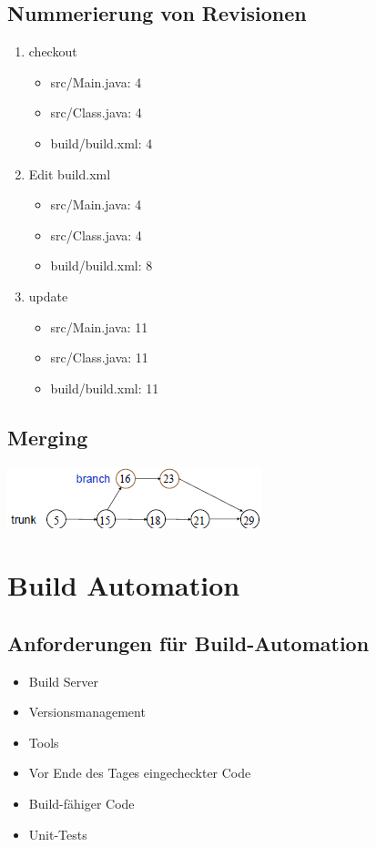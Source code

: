 \documentclass[a4paper,10pt]{article}
\begin{document}
\subsection{Nummerierung von Revisionen}
\begin{enumerate}
 \item checkout
\begin{itemize}
 \item src/Main.java: 4
 \item src/Class.java: 4
 \item build/build.xml: 4
\end{itemize}
 \item Edit build.xml
\begin{itemize}
 \item src/Main.java: 4
 \item src/Class.java: 4
 \item build/build.xml: 8
\end{itemize}
 \item update
\begin{itemize}
 \item src/Main.java: 11
 \item src/Class.java: 11
 \item build/build.xml: 11
\end{itemize}
\end{enumerate}

\subsection{Merging}
\includegraphics{merging.png}


\pagebreak
\section{Build Automation}
\subsection{Anforderungen für Build-Automation}
\begin{itemize}
 \item Build Server
 \item Versionsmanagement
 \item Tools
 \item Vor Ende des Tages eingecheckter Code
 \item Build-fähiger Code
 \item Unit-Tests
\end{itemize}
\end{document}
